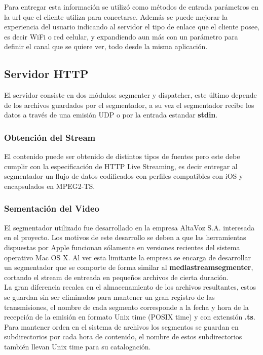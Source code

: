 	Para entregar esta información se utilizó como métodos de entrada parámetros en la url que el cliente utiliza para conectarse. Además se puede mejorar la experiencia del usuario indicando al servidor el tipo de enlace que el cliente posee, es decir WiFi o red celular, y expandiendo aun más con un parámetro para definir el canal que se quiere ver, todo desde la misma aplicación.
	
	\subsection{Servidor HTTP}
	El servidor consiste en dos módulos: segmenter y dispatcher, este último depende de los archivos guardados por el segmentador, a su vez el segmentador recibe los datos a través de una emisión UDP o por la entrada estandar \textbf{stdin}.
		\subsubsection{Obtención del Stream}
El contenido puede ser obtenido de distintos tipos de fuentes pero este debe cumplir con la especificación de HTTP Live Streaming, es decir entregar al segmentador un flujo de datos codificados con perfiles compatibles con iOS y encapsulados en MPEG2-TS.
		\subsubsection{Sementación del Video}

El segmentador utilizado fue desarrollado en la empresa AltaVoz S.A. interesada en el proyecto. Los motivos de este desarrollo se deben a que las herramientas dispuestas por Apple funcionan sólamente en versiones recientes del sistema operativo Mac OS X. Al ver esta limitante la empresa se encarga de desarrollar un segmentador que se comporte de forma similar al \textbf{mediastreamsegmenter}, cortando el stream de entreada en pequeños archivos de cierta duración.\\

 La gran diferencia recalca en el almacenamiento de los archivos resultantes, estos se guardan sin ser eliminados para mantener un gran registro de las transmisiones, el nombre de cada segmento corresponde a la fecha y hora de la recepción de la emisión en formato Unix time (POSIX time) y con extensión \textbf{.ts}. Para mantener orden en el sistema de archivos los segmentos se guardan en subdirectorios por cada hora de contenido, el nombre de estos subdirectorios también llevan Unix time para su catalogación.\\

